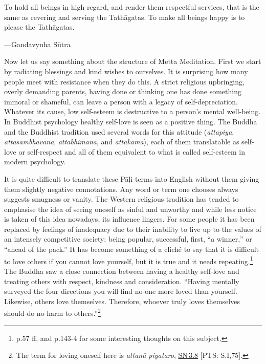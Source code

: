 \documentclass[10pt, openright]{book}
\newenvironment{epigram-2}%
{%
\vspace{1em}
\noindent
\quoting[leftmargin=2.5cm,rightmargin=2.5cm]%
\begin{itshape}
\large
}%
{\end{itshape}\endquoting
}%
\newenvironment{epigram-2-cite}%
{%
\quoting[leftmargin=2.5cm,rightmargin=2.5cm]%
\noindent\normal\hspace*{\fill} 
}%
{\endquoting\vspace{1em}
}%
\begin{document}
\begin{epigram-2}
To hold all beings in high regard, and render them respectful services, that is the same as revering and serving the Tathāgatas. To make all beings happy is to please the Tathāgatas.
\end{epigram-2}

\begin{epigram-2-cite}
—Gandavyuha Sūtra
\end{epigram-2-cite}

Now let us say something about the structure of Metta Meditation. First we start by radiating blessings and kind wishes to ourselves. It is surprising how many people meet with resistance when they do this. A strict religious upbringing, overly demanding parents, having done or thinking one has done something immoral or shameful, can leave a person with a legacy of self-depreciation. Whatever its cause, low self-esteem is destructive to a person’s mental well-being. In Buddhist psychology healthy self-love is seen as a positive thing. The Buddha and the Buddhist tradition used several words for this attitude (\textit{attapiya}, \textit{attasambhāvanā}, \textit{attābhimāna}, and \textit{attakāma}), each of them translatable as self-love or self-respect and all of them equivalent to what is called self-esteem in modern psychology.


It is quite difficult to translate these Pāḷi terms into English without them giving them slightly negative connotations. Any word or term one chooses always suggests smugness or vanity. The Western religious tradition has tended to emphasise the idea of seeing oneself as sinful and unworthy and while less notice is taken of this idea nowadays, its influence lingers. For some people it has been replaced by feelings of inadequacy due to their inability to live up to the values of an intensely competitive society: being popular, successful, first, “a winner,” or “ahead of the pack.” It has become something of a cliché to say that it is difficult to love others if you cannot love yourself, but it is true and it needs repeating.\footnote {\cite{Fromm 1956} p.57 ff, and \cite{Singer 2009e} p.143-4 for some interesting thoughts on this subject.} The Buddha saw a close connection between having a healthy self-love and treating others with respect, kindness and consideration. “Having mentally surveyed the four directions you will find no-one more loved than yourself. Likewise, others love themselves. Therefore, whoever truly loves themselves should do no harm to others.”\footnote {The term for loving oneself here is \textit{attanā piyataro}, \href{https://suttacentral.net/sn3.8/en/sujato}{SN 3.8} [PTS: S.I,75].}
\end{document}
